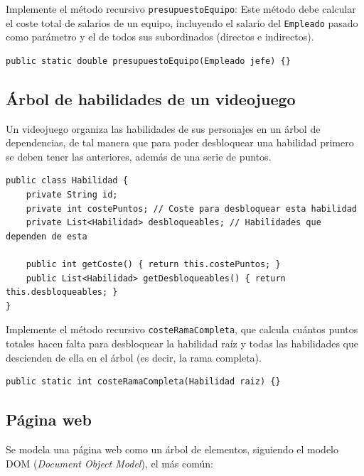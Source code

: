 \documentclass[a4paper]{article}
\newcommand{\code}[1]{\texttt{#1}}
\begin{document}
Implemente el método recursivo \code{presupuestoEquipo}: Este método debe calcular el coste total de salarios de un equipo, incluyendo el salario del \code{Empleado} pasado como parámetro y el de todos sus subordinados (directos e indirectos).

\begin{verbatim}
public static double presupuestoEquipo(Empleado jefe) {}
\end{verbatim}

\subsection{Árbol de habilidades de un videojuego}

Un videojuego organiza las habilidades de sus personajes en un árbol de dependencias, de tal manera que para poder desbloquear una habilidad primero se deben tener las anteriores, además de una serie de puntos.

\begin{verbatim}
public class Habilidad {
    private String id;
    private int costePuntos; // Coste para desbloquear esta habilidad
    private List<Habilidad> desbloqueables; // Habilidades que dependen de esta

    public int getCoste() { return this.costePuntos; }
    public List<Habilidad> getDesbloqueables() { return this.desbloqueables; }
}
\end{verbatim}

Implemente el método recursivo \code{costeRamaCompleta}, que calcula cuántos puntos totales hacen falta para desbloquear la habilidad raíz y todas las habilidades que descienden de ella en el árbol (es decir, la rama completa).

\begin{verbatim}
public static int costeRamaCompleta(Habilidad raiz) {}
\end{verbatim}

\subsection{Página web}

Se modela una página web como un árbol de elementos, siguiendo el modelo DOM (\textit{Document Object Model}), el más común:
\end{document}
